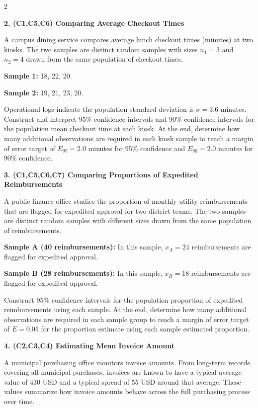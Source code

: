 \documentclass[12pt]{article}
\newcommand{\SubsectionBox}[1]{%
	\noindent\colorbox{gray!30}{%
		\parbox{\linewidth}{\textbf{#1}}%
	}\par\vspace{0.35cm}%
}
\begin{document}
\begin{multicols}{2}
		\vspace{0.25cm}
		\SubsectionBox{2. (C1,C5,C6) Comparing Average Checkout Times}\vspace{-0.25cm}
		A campus dining service compares average lunch checkout times (minutes) at two kiosks.
		The two samples are distinct random samples with sizes $n_1 = 3$ and $n_2 = 4$ drawn from the same population of checkout times.

		\textbf{Sample 1:} 18, 22, 20.

		\textbf{Sample 2:} 19, 21, 23, 20.

		Operational logs indicate the population standard deviation is $\sigma = 3.6$ minutes.
		Construct and interpret 95\% confidence intervals and 90\% confidence intervals for the population mean checkout time at each kiosk.
		At the end, determine how many additional observations are required in each kiosk sample to reach a margin of error target of $E_{95} = 2.0$ minutes for 95\% confidence and $E_{90} = 2.0$ minutes for 90\% confidence.

		\vspace{0.25cm}
		\SubsectionBox{3. (C1,C5,C6,C7) Comparing Proportions of Expedited Reimbursements}\vspace{-0.25cm}
		A public finance office studies the proportion of monthly utility reimbursements that are flagged for expedited approval for two district teams.
		The two samples are distinct random samples with different sizes drawn from the same population of reimbursements.

		\textbf{Sample A (40 reimbursements):}
		In this sample, $x_A = 24$ reimbursements are flagged for expedited approval.

		\textbf{Sample B (28 reimbursements):}
		In this sample, $x_B = 18$ reimbursements are flagged for expedited approval.

		Construct 95\% confidence intervals for the population proportion of expedited reimbursements using each sample.
		At the end, determine how many additional observations are required in each sample group to reach a margin of error target of $E = 0.05$ for the proportion estimate using each sample estimated proportion.

		\vspace{0.25cm}
		\SubsectionBox{4. (C2,C3,C4) Estimating Mean Invoice Amount}\vspace{-0.25cm}
		A municipal purchasing office monitors invoice amounts. From long-term records covering all municipal purchases, invoices are known to have a typical average value of 430 USD and a typical spread of 55 USD around that average. These values summarize how invoice amounts behave across the full purchasing process over time.


\end{multicols}
\end{document}
